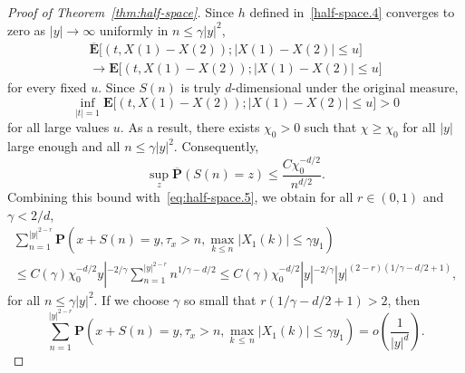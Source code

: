 \documentclass[AHL,Unicode,longabstracts,published]{cedram}
\newcommand{\pr}{\mathbf{P}}
\newcommand{\e}{\mathbf{E}}
\renewcommand{\le}{\leqslant}
\renewcommand{\ge}{\geqslant}
\begin{document}
\begin{proof}[Proof of Theorem~\ref{thm:half-space}]
Since $h$ defined in~\eqref{half-space.4} converges to zero as $|y|\to\infty$ uniformly in $n\le \gamma| y|^2$,
\begin{multline*}
\overline{\e}\big[\left(t,X(1)-X(2)\right);\left|X(1)-X(2)\right|\le u\big]\\
\to\e\big[\left(t,X(1)-X(2)\right);\left| X(1)-X(2)\right|\le u\big]
\end{multline*}
for every fixed $u$. Since $S(n)$ is truly $d$-dimensional under the original measure,
\[
\inf_{|t|=1}\e\big[\left(t,X(1)-X(2)\right);\left| X(1)-X(2)\right|\le u\big]>0
\]
for all large values $u$. As a result, there exists $\chi_0>0$ such that $\chi\ge\chi_0$ for all $| y|$ large enough and all $n\le \gamma| y|^2$. Consequently,
\begin{equation}\label{half-space.6}
\sup_z\overline{\pr}(S(n)=z)\le \frac{C\chi_0^{-d/2}}{n^{d/2}}.
\end{equation}
Combining this bound with~\eqref{eq:half-space.5}, we obtain for all $r\in(0,1)$ and $\gamma<2/d$,
\begin{multline}\label{eq:new.est.3}
\sum_{n=1}^{|y|^{2-r}} \pr\left(x+S(n)=y,\tau_x>n,\max_{k\le n}| X_1(k)|\le\gamma y_1\right)\\
\le C(\gamma)\chi_0^{-d/2} y|^{-2/\gamma} \sum_{n=1}^{|y|^{2-r}}n^{1/\gamma-d/2}
\le C(\gamma)\chi_0^{-d/2}|y|^{-2/\gamma}|y|^{(2-r)(1/\gamma-d/2+1)},
\end{multline}
for all $n\le \gamma| y|^2$. If we choose $\gamma$ so small that $r(1/\gamma-d/2+1)>2$, then
\begin{equation}\label{half-space.7}
\sum_{n=1}^{| y|^{2-r}} \pr\left(x+S(n)=y,\tau_x>n,\max_{k\,\le\,n}| X_1(k)|\le\gamma y_1\right) =o\left(\frac{1}{| y|^d}\right).
\end{equation}


\end{proof}
\end{document}
